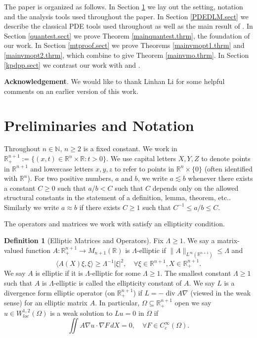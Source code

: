 \documentclass[11pt, a4paper,leqno]{amsart}
\theoremstyle{plain}
\theoremstyle{definition}
\newtheorem{definition}[equation]{Definition}
\theoremstyle{remark}
\numberwithin{equation}{section}
\newcommand{\re}{\mathbb{R}}
\newcommand{\rn}{\mathbb{R}^n}
\newcommand{\ree}{\mathbb{R}^{n+1}}
\newcommand{\om}{\Omega}
\def\div{\mathop{\operatorname{div}}\nolimits}
\begin{document}
The paper is organized as follows. In Section \ref{prelim.sect} we lay out the setting, notation and the analysis tools used throughout the paper. In Section \ref{PDEDLM.sect} we describe the classical PDE tools used throughout as well as the main result of \cite{DLM}. In Section \ref{quantest.sect} we prove Theorem \ref{mainquantest.thrm}, the foundation of our work. In Section \ref{mtproof.sect} we prove Theorems \ref{mainvmopt1.thrm} and \ref{mainvmopt2.thrm}, which combine to give Theorem \ref{mainvmo.thrm}. In Section \ref{kpdpp.sect} we contrast our work with \cite{KP} and \cite{DPP}.


{\bf Acknowledgement}. We would like to thank Linhan Li for some helpful comments on an earlier version of this work.


\section{Preliminaries and Notation}\label{prelim.sect}
Throughout $n \in \mathbb{N}$, $n \ge 2$ is a fixed constant. We work in $\ree_+:= \{(x,t) \in \rn \times \re: t > 0\}$. We use capital letters $X,Y, Z$ to denote points in $\ree$ and lowercase letters $x,y,z$ to refer to points in $\rn \times \{0\}$ (often identified with $\rn$). For two positive numbers, $a$ and $b$, we write $a \lesssim b$ whenever there exists a constant $C \ge 0$ such that $a/b < C$ such that $C$ depends only on the allowed structural constants in the statement of a definition, lemma, theorem, etc.. Similarly we write $a \approx b$ if there exists $C \ge 1$ such that $C^{-1} \le a/b \le C $.

The operators and matrices we work with satisfy an ellipticity condition.
\begin{definition}[Elliptic Matrices and Operators]
Fix $\Lambda \ge 1$. We say a matrix-valued function $A: \ree_+ \to M_{n+1}(\re)$ is $\Lambda$-elliptic if $\|A\|_{L^\infty(\ree)} \le \Lambda$ and
\[\langle A(X) \xi, \xi \rangle \ge \Lambda^{-1} |\xi|^2, \quad \forall \xi \in \ree, X \in \ree_+.\]
We say $A$ is elliptic if it is $\Lambda$-elliptic for some $\Lambda \ge 1$. The smallest constant $\Lambda \ge 1$ such that $A$ is $\Lambda$-elliptic is called the ellipticity constant of $A$.
We say $L$ is a divergence form elliptic operator (on $\ree_+$) if $L = -\div A \nabla$ (viewed in the weak sense) for an elliptic matrix $A$. In particular, $\Omega \subseteq \ree_+$ open we say $u \in W^{1,2}_{loc}(\om)$ is a weak solution to $Lu = 0$ in $\om$ if 
\[\iint A \nabla u \cdot \nabla F \, dX = 0, \quad \forall F \in C_c^\infty(\om).\]
\end{definition}
\end{document}
